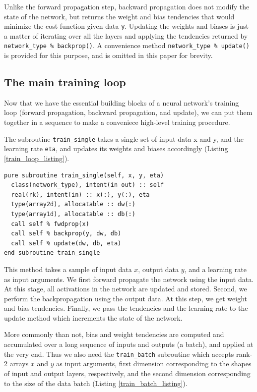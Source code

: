 \documentclass[sigplan, review=false, screen=true, balance=true]{acmart}
\begin{document}
Unlike the forward propagation step, backward propagation does not modify
the state of the network, but returns the weight and bias tendencies that
would minimize the cost function given data \lstinline{y}. Updating the weights
and biases is just a matter of iterating over all the layers and applying the
tendencies returned by \lstinline{network_type % backprop()}. A convenience
method \lstinline{network_type % update()} is provided for this purpose, and
is omitted in this paper for brevity.

\subsection{The main training loop}

Now that we have the essential building blocks of a neural network's training
loop (forward propagation, backward propagation, and update), we can put them
together in a sequence to make a conveniece high-level training procedure.

The subroutine \lstinline{train_single} takes a single set of input data x and y,
and the learning rate \lstinline{eta}, and updates its weights and biases
accordingly (Listing \ref{train_loop_listing}).

\begin{minipage}{\linewidth}
\begin{lstlisting}[caption={A training procedure for a single data sample.}, captionpos=b, label={train_loop_listing}]
pure subroutine train_single(self, x, y, eta)
  class(network_type), intent(in out) :: self
  real(rk), intent(in) :: x(:), y(:), eta
  type(array2d), allocatable :: dw(:)
  type(array1d), allocatable :: db(:)
  call self % fwdprop(x)
  call self % backprop(y, dw, db)
  call self % update(dw, db, eta)
end subroutine train_single
\end{lstlisting}
\end{minipage}

This method takes a sample of input data $x$, output data $y$, and a learning
rate as input arguments. We first forward propagate the network using the input
data. At this stage, all activations in the network are updated and stored.
Second, we perform the backpropagation using the output data. At this step,
we get weight and bias tendencies. Finally, we pass the tendencies and the
learning rate to the update method which increments the state of the network.

More commonly than not, bias and weight tendencies are computed and accumulated
over a long sequence of inputs and outputs (a batch), and applied
at the very end. Thus we also need the \lstinline{train_batch} subroutine
which accepts rank-2 arrays $x$ and $y$ as input arguments, first dimension
corresponding to the shapes of input and output layers, respectively, and the
second dimension corresponding to the size of the data batch
(Listing \ref{train_batch_listing}).
\end{document}
